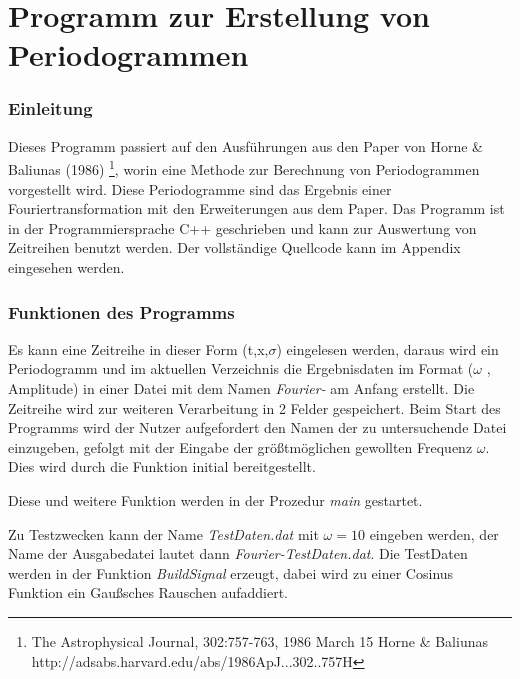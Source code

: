 \documentclass{scrartcl}
\begin{document}
\lstset{language=c++,breaklines=true,numbers=left,frame=single,
extendedchars=true,inputencoding=utf8}
\pagestyle{fancy}
\rhead{\today}
\part*{Programm zur Erstellung von Periodogrammen}
\section{Einleitung}
Dieses Programm passiert auf den Ausführungen aus den Paper von Horne \& Baliunas (1986) \footnote{The Astrophysical Journal, 302:757-763, 1986 March 15 Horne \& Baliunas http://adsabs.harvard.edu/abs/1986ApJ...302..757H}, worin eine Methode zur Berechnung von Periodogrammen vorgestellt wird. Diese Periodogramme sind das Ergebnis einer Fouriertransformation mit den Erweiterungen aus dem Paper. Das Programm ist in der Programmiersprache C++ geschrieben und kann zur Auswertung von Zeitreihen benutzt werden. Der vollständige Quellcode kann im Appendix eingesehen werden.

\section{Funktionen des Programms}

Es kann eine Zeitreihe in dieser Form (t,x,$\sigma$) eingelesen werden, daraus wird ein Periodogramm und im aktuellen Verzeichnis die Ergebnisdaten im Format ($\omega$ , Amplitude) in einer Datei mit dem Namen \textit{Fourier-} am Anfang erstellt. Die Zeitreihe wird zur weiteren Verarbeitung in 2 Felder gespeichert. Beim Start des Programms wird der Nutzer aufgefordert den Namen der zu untersuchende Datei einzugeben, gefolgt mit der Eingabe der größtmöglichen gewollten Frequenz $\omega$. Dies wird durch die Funktion initial bereitgestellt. 



Diese und weitere Funktion werden in der Prozedur \textit{main} gestartet.



Zu Testzwecken kann der Name \textit{TestDaten.dat} mit $ \omega = 10 $ eingeben werden, der Name der Ausgabedatei lautet dann \textit{Fourier-TestDaten.dat}. Die TestDaten werden in der Funktion \textit{BuildSignal} erzeugt, dabei wird zu einer Cosinus Funktion ein Gaußsches Rauschen aufaddiert. 
\end{document}
